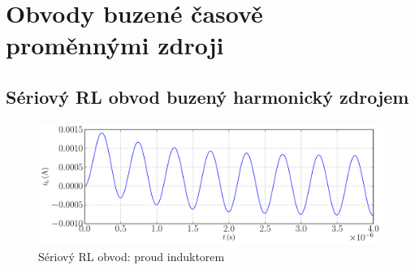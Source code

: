 \section{Obvody buzené časově proměnnými zdroji}

\subsection{Sériový RL obvod buzený harmonický zdrojem}

\begin{figure}[h!]
\centering
\includegraphics[width=13cm]{prechodne_jevy/prvni_rad/obvod_rl_harmonicky_proud.pdf}
\caption{Sériový RL obvod: proud induktorem}
\label{fig:obvod_rl_proud}
\end{figure}
